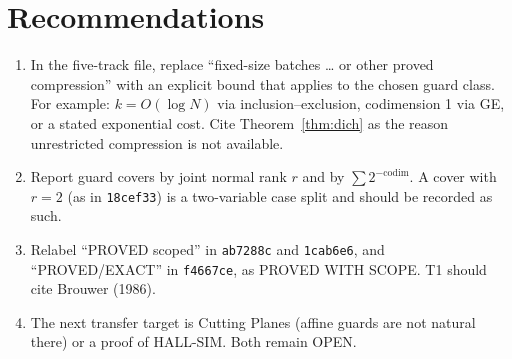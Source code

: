 \documentclass[11pt]{article}
\theoremstyle{definition}
\begin{document}
\section{Recommendations}
\begin{enumerate}
\item In the five-track file, replace ``fixed-size batches \ldots{} or other proved compression'' with an explicit bound that applies to the chosen guard class. For example: $k=O(\log N)$ via inclusion--exclusion, codimension 1 via GE, or a stated exponential cost. Cite Theorem~\ref{thm:dich} as the reason unrestricted compression is not available.
\item Report guard covers by joint normal rank $r$ and by $\sum2^{-\mathrm{codim}}$. A cover with $r=2$ (as in \texttt{18cef33}) is a two-variable case split and should be recorded as such.
\item Relabel ``PROVED scoped'' in \texttt{ab7288c} and \texttt{1cab6e6}, and ``PROVED/EXACT'' in \texttt{f4667ce}, as PROVED WITH SCOPE. T1 should cite Brouwer (1986).
\item The next transfer target is Cutting Planes (affine guards are not natural there) or a proof of HALL-SIM. Both remain OPEN.
\end{enumerate}
\end{document}
